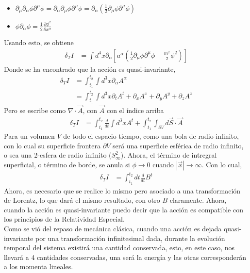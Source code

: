 \documentclass[../main.tex]{subfiles}
\begin{document}
\begin{itemize}
  \item $\partial_\mu \partial_\alpha \phi \partial^\mu \phi = \partial_\alpha \partial_\mu \phi \partial^\mu \phi = \partial_\alpha \left( \frac{1}{2}\partial_\mu \phi \partial^\mu \phi \right)$
  \item $\phi \partial_\alpha \phi = \frac{1}{2}\frac{\partial \phi^2}{\partial x^\alpha}$ 
\end{itemize}
Usando esto, se obtiene
\begin{align*}
  \delta_T I & = \int d^4x \partial_\alpha \left[ a^\alpha \left( \frac{1}{2}\partial_\mu \phi \partial^\mu \phi - \frac{m^2}{2}\phi^2 \right) \right]
\end{align*}
Donde se ha encontrado que la acción es quasi-invariante,
\begin{align*}
  \delta_T I & = \int_{t_1}^{t_2}\int d^3x \partial_\alpha A^\alpha \\
  & = \int_{t_1}^{t_2}\int d^3x \partial_t A^t + \partial_x A^x + \partial_y A^y + \partial_z A^z
\end{align*}
Pero se escribe como $\nabla \cdot \vec{A}$, con $\vec{A}$ con el índice arriba
\begin{align*}
  \delta_T I & = \int_{t_1}^{t_2}\frac{d}{dt}\int d^3 x A^t + \int_{t_1}^{t_2}\int_{\partial V} d\vec{S} \cdot \vec{A}
\end{align*}
Para un volumen $V$ de todo el espacio tiempo, como una bola de radio infinito, con lo cual su superficie frontera $\partial V$ será una superficie esférica de radio infinito, o sea una 2-esfera de radio infinito ($S^2_\infty$). Ahora, el término de intregral superficial, o término de borde, se anula si  $\phi\to 0$  cuando $|\vec{x}|\to\infty$. Con lo cual,
\begin{align*}
  \delta_T I & = \int_{t_1}^{t_2}dt\frac{d}{dt}B^t
\end{align*}
Ahora, es necesario que se realice lo mismo pero asociado a una transformación de Lorentz, lo que dará el mismo resultado, con otro $B$ claramente. Ahora, cuando la acción es quasi-invariante puedo decir que la acción es compatible con los principios de la Relatividad Especial. \\
Como se vió del repaso de mecánica clásica, cuando una acción es dejada quasi-invariante por una transformación infinitesimal dada, durante la evolución temporal del sistema existirá una cantidad conservada, esto, en este caso, nos llevará a 4 cantidades conservadas, una será la energía y las otras corresponderán a los momenta lineales. \\
\end{document}

